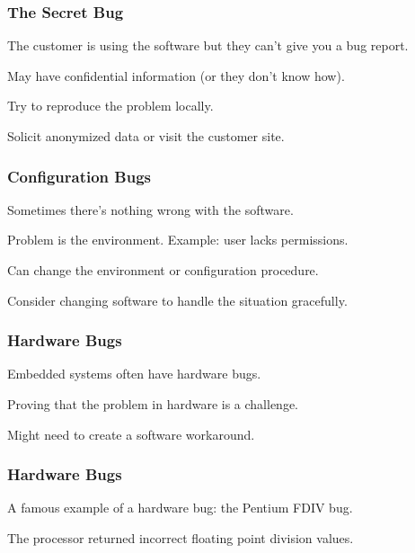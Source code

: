 \begin{frame}
\frametitle{The Secret Bug}
\begin{changemargin}{1cm}

The customer is using the software but they can't give you a bug report.

May have confidential information (or they don't know how).

Try to reproduce the problem locally.

Solicit anonymized data or visit the customer site.

\end{changemargin}
\end{frame}

\begin{frame}
\frametitle{Configuration Bugs}
\begin{changemargin}{1cm}

Sometimes there's nothing wrong with the software.

Problem is the environment. Example: user lacks permissions.

Can change the environment or configuration procedure.

Consider changing software to handle the situation gracefully.

\end{changemargin}
\end{frame}

\begin{frame}
\frametitle{Hardware Bugs}
\begin{changemargin}{1cm}

Embedded systems often have hardware bugs.

Proving that the problem in hardware is a challenge.

Might need to create a software workaround.

\end{changemargin}
\end{frame}

\begin{frame}
\frametitle{Hardware Bugs}
\begin{changemargin}{1cm}

A famous example of a hardware bug: the Pentium FDIV bug.

The processor returned incorrect floating point division values.

\end{changemargin}
\end{frame}

